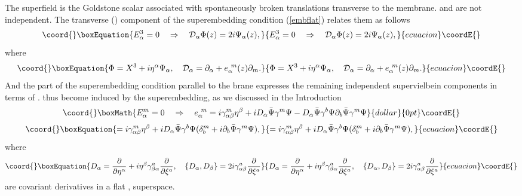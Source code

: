 \documentclass[a4paper,12pt]{article}
\begin{document}
The superfield \coordHE{} is the Goldstone scalar associated
with spontaneously broken translations transverse to the membrane.
\myHighlight{$\Psi_\alpha(\xi,\eta)$}\coordHE{} and \coordHE{} are not independent.
The transverse (\coordHE{}) component of the superembedding
condition (\ref{embflat}) relates them as follows
\begin{equation}\coord{}\boxEquation{\label{tran}
E^3_\alpha=0 \quad \Rightarrow \quad {\cal D}_\alpha
\Phi(z)=2i\Psi_\alpha(z),
}{E^3_\alpha=0 \quad \Rightarrow \quad {\cal D}_\alpha
\Phi(z)=2i\Psi_\alpha(z),
}{ecuacion}\coordE{}\end{equation}
where
\begin{equation}\coord{}\boxEquation{\label{X3}
\Phi=X^3+i\eta^\alpha\Psi_\alpha, \quad {\cal
D}_\alpha=\partial_\alpha+e^{~m}_\alpha(z)\partial_m.
}{\Phi=X^3+i\eta^\alpha\Psi_\alpha, \quad {\cal
D}_\alpha=\partial_\alpha+e^{~m}_\alpha(z)\partial_m.
}{ecuacion}\coordE{}\end{equation}
And the part of the superembedding condition parallel to the
brane expresses the remaining independent supervielbein components
\coordHE{} in terms of \myHighlight{$\Psi_\alpha$}\coordHE{}. \coordHE{} thus
become induced by the superembedding, as we discussed in the
Introduction
$$\coord{}\boxMath{
E^m_\alpha =0 \quad \Rightarrow \quad
e^{~m}_\alpha=i\gamma^m_{\alpha\beta}\eta^\beta+iD_\alpha\bar\Psi\gamma^m\Psi-
D_\alpha\bar\Psi\gamma^b\Psi
\partial_b\bar\Psi\gamma^m\Psi
}{dollar}{0pt}\coordE{}$$
\begin{equation}\coord{}\boxEquation{\label{epsi}
=i\gamma^m_{\alpha\beta}\eta^\beta+iD_\alpha\bar\Psi\gamma^b\Psi
(\delta_b^m+i\partial_b\bar\Psi\gamma^m\Psi),
}{=i\gamma^m_{\alpha\beta}\eta^\beta+iD_\alpha\bar\Psi\gamma^b\Psi
(\delta_b^m+i\partial_b\bar\Psi\gamma^m\Psi),
}{ecuacion}\coordE{}\end{equation}
where
\begin{equation}\coord{}\boxEquation{\label{Da}
D_\alpha={\partial\over{\partial\eta^\alpha}}+i\eta^\beta\gamma^a_{\beta\alpha}
{\partial\over{\partial\xi^a}}, \quad
\{D_\alpha,D_\beta\}=2i\gamma^a_{\alpha\beta}
{\partial\over{\partial\xi^a}}
}{D_\alpha={\partial\over{\partial\eta^\alpha}}+i\eta^\beta\gamma^a_{\beta\alpha}
{\partial\over{\partial\xi^a}}, \quad
\{D_\alpha,D_\beta\}=2i\gamma^a_{\alpha\beta}
{\partial\over{\partial\xi^a}}
}{ecuacion}\coordE{}\end{equation}
are covariant derivatives in a flat \coordHE{}, \coordHE{} superspace.
\end{document}
